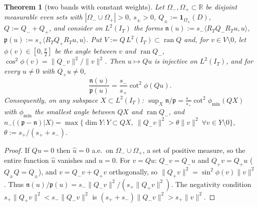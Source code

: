 \documentclass[11pt]{amsart}
\newtheorem{theorem}{Theorem}[section]
\theoremstyle{definition}
\theoremstyle{remark}
\newcommand{\R}{\mathbb R}
\newcommand{\IT}{I_T}
\begin{document}
\begin{theorem}[two bands with constant weights]\label{thm:wh-angles}
Let $\Omega_-,\Omega_+\subset\R$ be disjoint measurable even sets with $|\Omega_-\cup\Omega_+|>0$,
$s_\pm>0$, $Q_\pm:=\mathbf 1_{\Omega_\pm}(D)$, $Q:=Q_-+Q_+$, and consider on $L^2(\IT)$ the forms
$\mathfrak n(u):=s_-\langle R_TQ_-R_Tu,u\rangle$, $\mathfrak p(u):=s_+\langle R_TQ_+R_Tu,u\rangle$. Put
$V:=Q\,L^2(\IT)\subset\operatorname{ran}Q$ and, for $v\in V\setminus0$, let $\phi(v)\in[0,\frac\pi2]$ be the angle
between $v$ and $\operatorname{ran}Q_-$, $\cos^2\phi(v)=\|Q_-v\|^2/\|v\|^2$. Then $u\mapsto Qu$ is injective on $L^2(\IT)$,
and for every $u\ne0$ with $Q_+u\ne0$,
\[
\frac{\mathfrak n(u)}{\mathfrak p(u)}=\frac{s_-}{s_+}\cot^2\phi(Qu).
\]
Consequently, on any subspace $X\subset L^2(\IT)$: $\sup_X\mathfrak n/\mathfrak p=\frac{s_-}{s_+}\cot^2\phi_{\min}(QX)$ with
$\phi_{\min}$ the smallest angle between $QX$ and $\operatorname{ran}Q_-$, and
$n_-\big((\mathfrak p-\mathfrak n)|X\big)=\max\{\dim Y:Y\subset QX,\ \|Q_-v\|^2>\theta\|v\|^2\ \forall v\in Y\setminus0\}$,
$\theta:=s_+/(s_++s_-)$.
\end{theorem}
\begin{proof}
If $Qu=0$ then $\widehat u=0$ a.e.\ on $\Omega_-\cup\Omega_+$, a set of positive measure, so the entire function
$\widehat u$ vanishes and $u=0$. For $v=Qu$: $Q_-v=Q_-u$ and $Q_+v=Q_+u$ ($Q_\pm Q=Q_\pm$), and
$v=Q_-v+Q_+v$ orthogonally, so $\|Q_+v\|^2=\sin^2\phi(v)\|v\|^2$. Thus
$\mathfrak n(u)/\mathfrak p(u)=s_-\|Q_-v\|^2/(s_+\|Q_+v\|^2)$. The negativity condition
$s_+\|Q_+v\|^2<s_-\|Q_-v\|^2$ is $(s_++s_-)\|Q_-v\|^2>s_+\|v\|^2$.
\end{proof}
\end{document}
